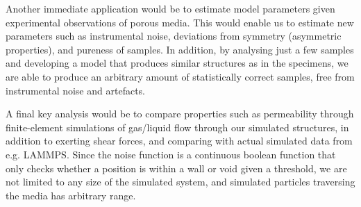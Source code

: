 \documentclass[aps,pre,twocolumn,letterpaper,floatfix,showpacs]{revtex4}
\begin{document}
Another immediate application would be to estimate model parameters given experimental observations of porous media. 
This would enable us to estimate new parameters such as instrumental noise, deviations from symmetry
(asymmetric properties), and pureness of samples. 
In addition, by analysing just a few samples and developing a model that produces similar structures
as in the specimens, we are able to produce an arbitrary amount of statistically correct samples,
free from instrumental noise and artefacts. 

A final key analysis would be to compare properties such as permeability through finite-element
simulations of gas/liquid flow through our simulated structures, in addition to exerting shear forces,
and comparing with actual simulated data from e.g. LAMMPS. 
Since the noise function is a continuous boolean function that only checks whether a position is
within a wall or void given a threshold, we are not limited to any size of the simulated system, and simulated particles traversing the media has arbitrary range.  


\end{document}
